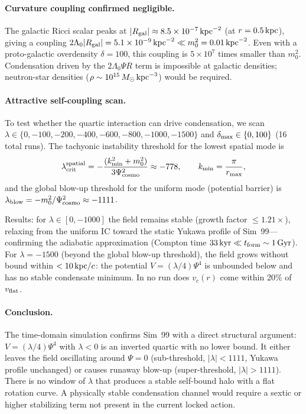 \documentclass[12pt,a4paper]{article}
\begin{document}
\paragraph{Curvature coupling confirmed negligible.}
The galactic Ricci scalar peaks at
$|R_{\rm gal}| \approx 8.5\times10^{-7}\,{\rm kpc}^{-2}$ (at
$r=0.5\,{\rm kpc}$), giving a coupling
$2\Lambda_0|R_{\rm gal}| = 5.1\times10^{-9}\,{\rm kpc}^{-2}
\ll m_0^2 = 0.01\,{\rm kpc}^{-2}$.
Even with a proto-galactic overdensity $\delta=100$, this coupling is
$5\times10^7$ times smaller than $m_0^2$.  Condensation driven by the
$2\Lambda_0\Psi R$ term is impossible at galactic densities; neutron-star
densities ($\rho\sim10^{15}\,M_\odot\,{\rm kpc}^{-3}$) would be required.

\paragraph{Attractive self-coupling scan.}
To test whether the quartic interaction can drive condensation, we scan
$\lambda\in\{0,-100,-200,-400,-600,-800,-1000,-1500\}$ and
$\delta_{\rm max}\in\{0,100\}$ (16 total runs).  The tachyonic instability
threshold for the lowest spatial mode is
\begin{equation}
  \lambda_{\rm crit}^{\rm spatial}
    = -\frac{(k_{\rm min}^2 + m_0^2)}{3\Psi_{\rm cosmo}^2}
    \approx -778,
  \qquad
  k_{\rm min} = \frac{\pi}{r_{\rm max}},
\end{equation}
and the global blow-up threshold for the uniform mode (potential barrier)
is $\lambda_{\rm blow} = -m_0^2/\Psi_{\rm cosmo}^2 \approx -1111$.

Results: for $\lambda\in[0,-1000]$ the field remains stable (growth
factor $\leq 1.21\times$), relaxing from the uniform IC toward the static
Yukawa profile of Sim~99---confirming the adiabatic approximation
(Compton time $33\,{\rm kyr} \ll t_{\rm form}\sim1\,{\rm Gyr}$).  For
$\lambda=-1500$ (beyond the global blow-up threshold), the field grows
without bound within $< 10\,{\rm kpc}/c$: the potential $V=(\lambda/4)\Psi^4$
is unbounded below and has no stable condensate minimum.  In no run does
$v_c(r)$ come within 20\% of $v_{\rm flat}$.

\paragraph{Conclusion.}
The time-domain simulation confirms Sim~99 with a direct structural
argument: $V=(\lambda/4)\Psi^4$ with $\lambda<0$ is an inverted quartic
with no lower bound.  It either leaves the field oscillating around
$\Psi=0$ (sub-threshold, $|\lambda|<1111$, Yukawa profile unchanged) or
causes runaway blow-up (super-threshold, $|\lambda|>1111$).  There is no
window of $\lambda$ that produces a stable self-bound halo with a flat
rotation curve.  A physically stable condensation channel would require a
sextic or higher stabilizing term not present in the current locked action.
\end{document}
